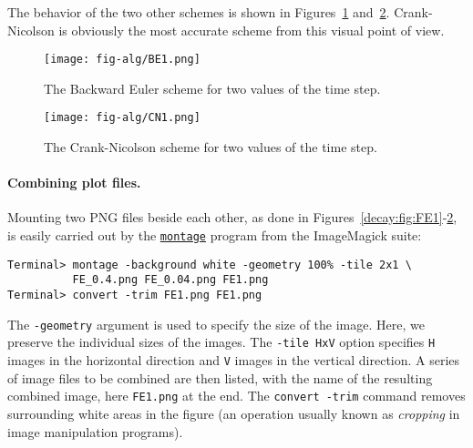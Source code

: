 \documentclass[graybox,sectrefs,envcountresetchap,open=right,final]{svmonodo}
\begin{document}
The behavior of the two other schemes is shown in Figures~\ref{decay:fig:BE1}
and~\ref{decay:fig:CN1}. Crank-Nicolson is obviously the most accurate
scheme from this visual point of view.


\begin{figure}[!ht]  %
  \centerline{\texttt{[image: fig-alg/BE1.png]}}
  \caption{
  The Backward Euler scheme for two values of the time step. \label{decay:fig:BE1}
  }
\end{figure}



\begin{figure}[!ht]  %
  \centerline{\texttt{[image: fig-alg/CN1.png]}}
  \caption{
  The Crank-Nicolson scheme for two values of the time step. \label{decay:fig:CN1}
  }
\end{figure}




\paragraph{Combining plot files.}
Mounting two PNG files beside each other, as done in Figures~\ref{decay:fig:FE1}-\ref{decay:fig:CN1}, is easily carried out by the
\href{{http://www.imagemagick.org/script/montage.php}}{\nolinkurl{montage}} program
from the ImageMagick suite:

\begin{Verbatim}[frame=lines,label=\fbox{{\tiny Terminal}},framesep=2.5mm,framerule=0.7pt,fontsize=\fontsize{9pt}{9pt}]
Terminal> montage -background white -geometry 100% -tile 2x1 \ 
          FE_0.4.png FE_0.04.png FE1.png
Terminal> convert -trim FE1.png FE1.png
\end{Verbatim}
The \texttt{-geometry} argument is used to specify the size of the image. Here,
we preserve the individual sizes of the images. The \texttt{-tile HxV} option
specifies \texttt{H} images in the horizontal direction and \texttt{V} images in
the vertical direction. A series of image files to be combined are then listed,
with the name of the resulting combined image, here \texttt{FE1.png} at the end.
The \texttt{convert -trim} command removes surrounding white areas in the figure
(an operation usually known as \emph{cropping} in image manipulation programs).
\end{document}
